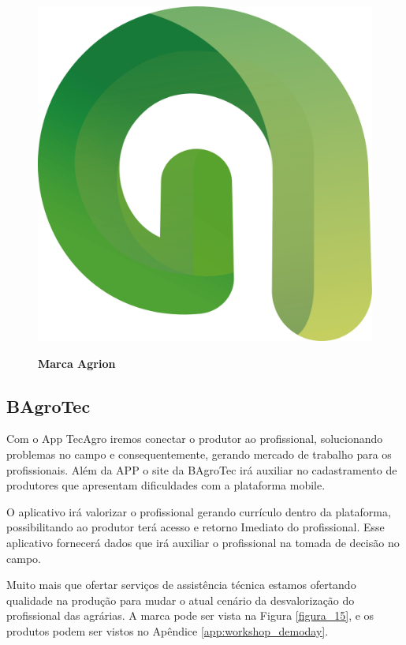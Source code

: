 \begin{figure}[H]
\centering
\caption{\textbf{Marca Agrion}}
\includegraphics[scale=0.3]{Imagens/agrion.png}
\label{figura_14}
\end{figure}

\subsection{BAgroTec}

Com o App TecAgro iremos conectar o produtor ao profissional, solucionando problemas no campo e consequentemente, gerando mercado de trabalho para os profissionais. Além da APP o site da BAgroTec irá auxiliar no cadastramento de produtores que apresentam dificuldades com a plataforma mobile.

O aplicativo irá valorizar o profissional gerando currículo dentro da plataforma, possibilitando ao produtor terá acesso e retorno Imediato do profissional. Esse aplicativo fornecerá dados que irá auxiliar o profissional na tomada de decisão no campo.

Muito mais que ofertar serviços de assistência técnica estamos ofertando qualidade na produção para mudar o atual cenário da desvalorização do profissional das agrárias. A marca pode ser vista na Figura \ref{figura_15}, e os produtos podem ser vistos no Apêndice \ref{app:workshop_demoday}.

